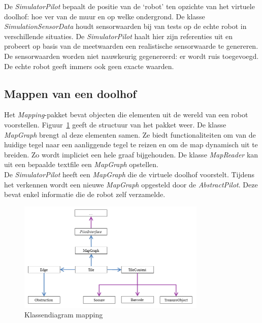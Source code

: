 \documentclass[tt2]{penoverslag}
\begin{document}
De \textit{SimulatorPilot} bepaalt de positie van de `robot' ten opzichte van het virtuele doolhof: hoe ver van de muur en op welke ondergrond. De klasse \textit{SimulationSensorData} houdt sensorwaarden bij van tests op de echte robot in verschillende situaties. De \textit{SimulatorPilot} haalt hier zijn referenties uit en probeert op basis van de meetwaarden een realistische sensorwaarde te genereren. De sensorwaarden worden niet nauwkeurig gegenereerd: er wordt ruis toegevoegd. De echte robot geeft immers ook geen exacte waarden.\\

\subsection{Mappen van een doolhof} %
\label{ssec:Mapping}
Het \textit{Mapping}-pakket bevat objecten die elementen uit de wereld van een robot voorstellen. Figuur~\ref{fig:klasMap} geeft de structuur van het pakket weer. De klasse \textit{MapGraph} brengt al deze elementen samen. Ze biedt functionaliteiten om van de huidige tegel naar een aanliggende tegel te reizen en om de map dynamisch uit te breiden. Zo wordt impliciet een hele graaf bijgehouden. De klasse \textit{MapReader} kan uit een bepaalde textfile een \textit{MapGraph} opstellen.\\

De \textit{SimulatorPilot} heeft een \textit{MapGraph} die de virtuele doolhof voorstelt. Tijdens het verkennen wordt een nieuwe \textit{MapGraph} opgesteld door de \textit{AbstractPilot}. Deze bevat enkel informatie die de robot zelf verzamelde.

\begin{figure}[h]
\centering
	\includegraphics[width=0.8\textwidth]{klasMapping}
\caption{Klassendiagram mapping}
\label{fig:klasMap}
\end{figure}
\end{document}

